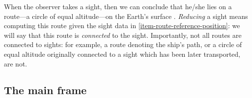\documentclass{ol-softwaremanual}
\begin{document}
When the observer takes a \gls{sight}, then we can conclude that he/she lies on a route---a circle of equal altitude---on the Earth's surface \cite{bowditch2002the}. 
\textit{Reducing} a \gls{sight} means computing this route given the \gls{sight} data in \cref{item-route-reference-position}: we will say that this route is \textit{connected} to the \gls{sight}. Importantly, not all routes are connected to \glspl{sight}: for example, a route denoting the ship's path, or a circle of equal altitude originally connected to a \gls{sight} which has been later transported, are not. 



\subsection{The main frame}
\end{document}
